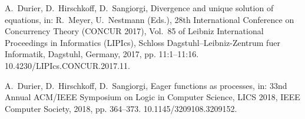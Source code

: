 \documentclass[GCNS]{yincog}
\theoremstyle{remark}
\theoremstyle{theorem}
\theoremstyle{remark}
\begin{document}
\begin{backmatter}
\begin{thebibliography}{}
\begin{bsubitem}
\begin{bcontribution}%
\end{bcontribution}
\begin{bhost}
\begin{beditedbook}
\end{beditedbook}
\end{bhost}
\end{bsubitem}
%
\OrigBibText
A.~Durier, D.~Hirschkoff, D.~Sangiorgi, Divergence and unique solution
of equations, in: R.~Meyer, U.~Nestmann (Eds.), 28th International Conference
on Concurrency Theory (CONCUR 2017), Vol.~85 of Leibniz International Proceedings
in Informatics (LIPIcs), Schloss Dagstuhl--Leibniz-Zentrum fuer Informatik,
Dagstuhl, Germany, 2017, pp. 11:1--11:16. 10.4230/LIPIcs.CONCUR.2017.11.
\endOrigBibText
{}%
\endbibitem

\begin{bsubitem}
\begin{bcontribution}%
\end{bcontribution}
\begin{bhost}
\begin{beditedbook}
\end{beditedbook}
\end{bhost}
\end{bsubitem}
%
\OrigBibText
A.~Durier, D.~Hirschkoff, D.~Sangiorgi, Eager functions as processes, in:
33nd Annual {ACM/IEEE} Symposium on Logic in Computer Science, {LICS} 2018,
{IEEE} Computer Society, 2018, pp. 364--373. 10.1145/3209108.3209152.
\endOrigBibText
{}%
\endbibitem

\end{thebibliography}

\end{backmatter}
\end{document}
